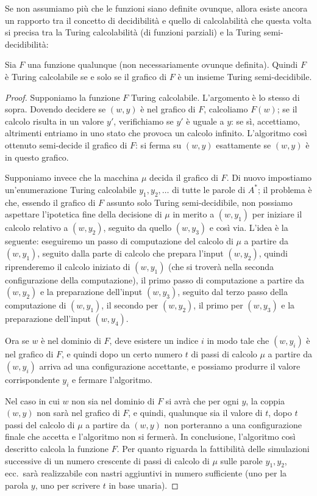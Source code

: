 Se non assumiamo più che le funzioni siano definite ovunque, allora esiste ancora un rapporto tra il concetto di decidibilità e quello di calcolabilità che questa volta si precisa tra la Turing calcolabilità (di funzioni parziali) e la Turing semi-decidibilità:

\begin{prop}
Sia $F$ una funzione qualunque (non necessariamente ovunque definita). Quindi $F$ è Turing calcolabile se e solo se il grafico di $F$ è un insieme Turing semi-decidibile.
\end{prop}

\begin{proof}
Supponiamo la funzione $F$ Turing calcolabile. L'argomento è lo stesso di sopra. Dovendo decidere se $(w,y)$ è nel grafico di $F$, calcoliamo $F(w)$; se il calcolo risulta in un valore $y'$, verifichiamo se $y'$ è uguale a $y$: se sì, accettiamo, altrimenti entriamo in uno stato che provoca un calcolo infinito. L'algoritmo così ottenuto semi-decide il grafico di $F$: si ferma su $(w,y)$ esattamente se $(w,y)$ è in questo grafico.

Supponiamo invece che la macchina $\mu$ decida il grafico di $F$. Di nuovo impostiamo un'enumerazione Turing calcolabile $y_1,y_2,\dots$ di tutte le parole di $A^*$; il problema è che, essendo il grafico di $F$ assunto solo Turing semi-decidibile, non possiamo aspettare l'ipotetica fine della decisione di $\mu$ in merito a $(w,y_1)$ per iniziare il calcolo relativo a $(w,y_2)$, seguito da quello $(w,y_3)$ e così via. L'idea è la seguente: eseguiremo un passo di computazione del calcolo di $\mu$ a partire da $(w,y_1)$, seguito dalla parte di calcolo che prepara l'input $(w,y_2)$, quindi riprenderemo il calcolo iniziato di $(w,y_1)$ (che si troverà nella seconda configurazione della computazione), il primo passo di computazione a partire da $(w,y_2)$ e la preparazione dell'input $(w,y_3)$, seguito dal terzo passo della computazione di $(w,y_1)$, il secondo per $(w,y_2)$, il primo per $(w,y_3)$ e la preparazione dell'input $(w,y_4)$.

Ora se $w$ è nel dominio di $F$, deve esistere un indice $i$ in modo tale che $(w,y_i)$ è nel grafico di $F$, e quindi dopo un certo numero $t$ di passi di calcolo $\mu$ a partire da $(w,y_i)$ arriva ad una configurazione accettante, e possiamo produrre il valore corrispondente $y_i$ e fermare l'algoritmo.

Nel caso in cui $w$ non sia nel dominio di $F$ si avrà che per ogni $y$, la coppia $(w,y)$ non sarà nel grafico di $F$, e quindi, qualunque sia il valore di $t$, dopo $t$ passi del calcolo di $\mu$ a partire da $(w,y)$ non porteranno a una configurazione finale che accetta e l'algoritmo non si fermerà. In conclusione, l'algoritmo così descritto calcola la funzione $F$. Per quanto riguarda la fattibilità delle simulazioni successive di un numero crescente di passi di calcolo di $\mu$ sulle parole $y_1,y_2$, ecc.\ sarà realizzabile con nastri aggiuntivi in numero sufficiente (uno per la parola $y$, uno per scrivere $t$ in base unaria).
\end{proof}

